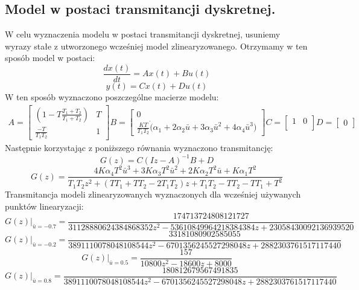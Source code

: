 \subsection{Model w postaci transmitancji dyskretnej.}
W celu wyznaczenia modelu w postaci transmitancji dyskretnej, usuniemy wyrazy stałe z utworzonego wcześniej model zlinearyzowanego. Otrzymamy w ten sposób model w postaci:
\begin{equation}
\frac{dx(t)}{dt} = Ax(t) + Bu(t)
\end{equation}
\begin{equation}
y(t)=Cx(t) + Du(t)
\end{equation}
W ten sposób wyznaczono poszczególne macierze modelu: \\
\begin{multline}
A=
\begin{bmatrix}
    (1-T\frac{T_{1}+T_{2}}{T_{1}+T_{2}}) & T \\
    \frac{-T}{T_{1}T_{2}} & 1
\end{bmatrix}
B=
\begin{bmatrix}
    0 \\
    \frac{KT}{T_{1}T_{2}} \dot (\alpha_{1} + 2\alpha_{2}\bar{u} + 3\alpha_{3}\bar{u}^2 + 4\alpha_{4}\bar{u}^3)
\end{bmatrix}
C=
\begin{bmatrix}
    1 & 0 \\
\end{bmatrix}
D=
\begin{bmatrix}
     0
\end{bmatrix}
\end{multline}
Następnie korzystając z poniższego równania wyznaczono transmitancję:
\begin{equation}
G(z)=C(Iz-A)^{-1}B + D
\end{equation}
\begin{equation}
G(z)=
\frac{4K\alpha_{4}T^2\bar{u}^3 + 3K\alpha_{3}T^2\bar{u}^2 + 2K\alpha_{2}T^2\bar{u} + K\alpha_{1}T^2}{T_{1}T_{2}z^2 + (TT_{1} + TT_{2} - 2T_{1}T_{2})z + T_{1}T_{2} - TT_{2} - TT_{1} + T^2}
\end{equation}
Transmitancja modeli zlinearyzowanych wyznaczonych dla wcześniej używanych punktów linearyzacji:
\begin{equation}
G(z)\bigg\rvert_{\bar{u}=-0.7}=\frac{174713724808121727}{31128880624384868352z^2 - 53610849964218384384z + 23058430092136939520}
\end{equation}
\begin{equation}
G(z)\bigg\rvert_{\bar{u}=-0.2}=\frac{33181080902585055}{3891110078048108544z^2 - 6701356245527298048z + 2882303761517117440}
\end{equation}
\begin{equation}
G(z)\bigg\rvert_{\bar{u}=0.5}=\frac{157}{10800z^2 - 18600z + 8000}
\end{equation}
\begin{equation}
G(z)\bigg\rvert_{\bar{u}=0.8}=\frac{180812679567491835}{3891110078048108544z^2 - 6701356245527298048z + 2882303761517117440}
\end{equation}
